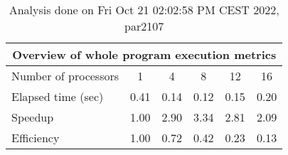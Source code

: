 \begin{table}[h]
\begin{center}
\begin{tabular}{|l|c|c|c|c|c|}
\hline
\multicolumn{6}{|c|}{Overview of whole program execution metrics} \\
\hline
\hline
Number of processors & 1 & 4 & 8 & 12 & 16 \\
\hline
Elapsed time (sec)      &       0.41 &       0.14 &       0.12 &       0.15 &       0.20 \\
\hline
Speedup                 &       1.00 &       2.90 &       3.34 &       2.81 &       2.09 \\
\hline
Efficiency              &       1.00 &       0.72 &       0.42 &       0.23 &       0.13 \\
\hline
\end{tabular}
\end{center}
\caption{ Analysis done on Fri Oct 21 02:02:58 PM CEST 2022, par2107}
\end{table}
